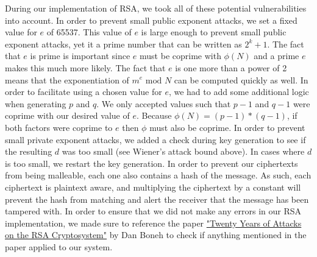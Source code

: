 		During our implementation of RSA, we took all of these potential vulnerabilities into account. In order to prevent small public exponent attacks, we set a fixed value for $e$ of 65537.
		This value of $e$ is large enough to prevent small public exponent attacks, yet it a prime number that can be written as $2^k+1$. The fact that $e$ is prime is important since $e$ must
		be coprime with $\phi(N)$ and a prime $e$ makes this much more likely. The fact that $e$ is one more than a power of 2 means that the exponentiation of $m^e\text{ mod }N$ can be
		computed quickly as well. In order to facilitate using a chosen value for $e$, we had to add some additional logic when generating $p$ and $q$. We only accepted values such that $p-1$ and
		$q-1$ were coprime with our desired value of $e$. Because $\phi(N)=(p-1)*(q-1)$, if both factors were coprime to $e$ then $\phi$ must also be coprime. In order to prevent small private
		exponent attacks, we added a check during key generation to see if the resulting $d$ was too small (see Wiener's attack bound above). In cases where $d$ is too small, we restart the key
		generation. In order to prevent our ciphertexts from being malleable, each one also contains a hash of the message. As such, each ciphertext is plaintext aware, and multiplying the
		ciphertext by a constant will prevent the hash from matching and alert the receiver that the message has been tampered with. In order to ensure that we did not make any errors in our
		RSA implementation, we made sure to reference the paper \href{https://crypto.stanford.edu/~dabo/pubs/papers/RSA-survey.pdf}{"Twenty Years of Attacks on the RSA Cryptosystem"} by Dan
		Boneh to check if anything mentioned in the paper applied to our system.
